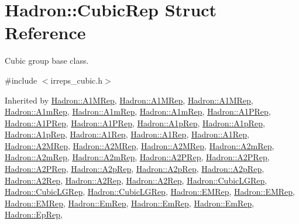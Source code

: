 \hypertarget{structHadron_1_1CubicRep}{}\section{Hadron\+:\+:Cubic\+Rep Struct Reference}
\label{structHadron_1_1CubicRep}


Cubic group base class.  




{\ttfamily \#include $<$irreps\+\_\+cubic.\+h$>$}



Inherited by \mbox{\hyperlink{structHadron_1_1A1MRep}{Hadron\+::\+A1\+M\+Rep}}, \mbox{\hyperlink{structHadron_1_1A1MRep}{Hadron\+::\+A1\+M\+Rep}}, \mbox{\hyperlink{structHadron_1_1A1MRep}{Hadron\+::\+A1\+M\+Rep}}, \mbox{\hyperlink{structHadron_1_1A1mRep}{Hadron\+::\+A1m\+Rep}}, \mbox{\hyperlink{structHadron_1_1A1mRep}{Hadron\+::\+A1m\+Rep}}, \mbox{\hyperlink{structHadron_1_1A1mRep}{Hadron\+::\+A1m\+Rep}}, \mbox{\hyperlink{structHadron_1_1A1PRep}{Hadron\+::\+A1\+P\+Rep}}, \mbox{\hyperlink{structHadron_1_1A1PRep}{Hadron\+::\+A1\+P\+Rep}}, \mbox{\hyperlink{structHadron_1_1A1PRep}{Hadron\+::\+A1\+P\+Rep}}, \mbox{\hyperlink{structHadron_1_1A1pRep}{Hadron\+::\+A1p\+Rep}}, \mbox{\hyperlink{structHadron_1_1A1pRep}{Hadron\+::\+A1p\+Rep}}, \mbox{\hyperlink{structHadron_1_1A1pRep}{Hadron\+::\+A1p\+Rep}}, \mbox{\hyperlink{structHadron_1_1A1Rep}{Hadron\+::\+A1\+Rep}}, \mbox{\hyperlink{structHadron_1_1A1Rep}{Hadron\+::\+A1\+Rep}}, \mbox{\hyperlink{structHadron_1_1A1Rep}{Hadron\+::\+A1\+Rep}}, \mbox{\hyperlink{structHadron_1_1A2MRep}{Hadron\+::\+A2\+M\+Rep}}, \mbox{\hyperlink{structHadron_1_1A2MRep}{Hadron\+::\+A2\+M\+Rep}}, \mbox{\hyperlink{structHadron_1_1A2MRep}{Hadron\+::\+A2\+M\+Rep}}, \mbox{\hyperlink{structHadron_1_1A2mRep}{Hadron\+::\+A2m\+Rep}}, \mbox{\hyperlink{structHadron_1_1A2mRep}{Hadron\+::\+A2m\+Rep}}, \mbox{\hyperlink{structHadron_1_1A2mRep}{Hadron\+::\+A2m\+Rep}}, \mbox{\hyperlink{structHadron_1_1A2PRep}{Hadron\+::\+A2\+P\+Rep}}, \mbox{\hyperlink{structHadron_1_1A2PRep}{Hadron\+::\+A2\+P\+Rep}}, \mbox{\hyperlink{structHadron_1_1A2PRep}{Hadron\+::\+A2\+P\+Rep}}, \mbox{\hyperlink{structHadron_1_1A2pRep}{Hadron\+::\+A2p\+Rep}}, \mbox{\hyperlink{structHadron_1_1A2pRep}{Hadron\+::\+A2p\+Rep}}, \mbox{\hyperlink{structHadron_1_1A2pRep}{Hadron\+::\+A2p\+Rep}}, \mbox{\hyperlink{structHadron_1_1A2Rep}{Hadron\+::\+A2\+Rep}}, \mbox{\hyperlink{structHadron_1_1A2Rep}{Hadron\+::\+A2\+Rep}}, \mbox{\hyperlink{structHadron_1_1A2Rep}{Hadron\+::\+A2\+Rep}}, \mbox{\hyperlink{structHadron_1_1CubicLGRep}{Hadron\+::\+Cubic\+L\+G\+Rep}}, \mbox{\hyperlink{structHadron_1_1CubicLGRep}{Hadron\+::\+Cubic\+L\+G\+Rep}}, \mbox{\hyperlink{structHadron_1_1CubicLGRep}{Hadron\+::\+Cubic\+L\+G\+Rep}}, \mbox{\hyperlink{structHadron_1_1EMRep}{Hadron\+::\+E\+M\+Rep}}, \mbox{\hyperlink{structHadron_1_1EMRep}{Hadron\+::\+E\+M\+Rep}}, \mbox{\hyperlink{structHadron_1_1EMRep}{Hadron\+::\+E\+M\+Rep}}, \mbox{\hyperlink{structHadron_1_1EmRep}{Hadron\+::\+Em\+Rep}}, \mbox{\hyperlink{structHadron_1_1EmRep}{Hadron\+::\+Em\+Rep}}, \mbox{\hyperlink{structHadron_1_1EmRep}{Hadron\+::\+Em\+Rep}}, \mbox{\hyperlink{structHadron_1_1EpRep}{Hadron\+::\+Ep\+Rep}}, 